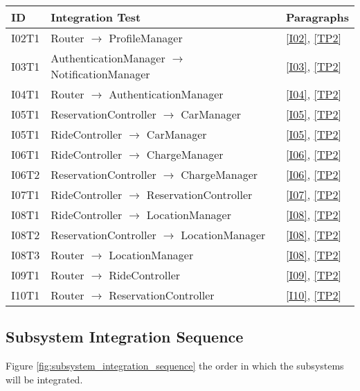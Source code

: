 	\begin{center}
		\vspace{0.6cm}
		\begin{tabular}{|l|l|l|}
			\hline
			\textbf{ID} & \textbf{Integration Test} & \textbf{Paragraphs} \bigstrut \\\hline
			\hline
			I02T1 & Router \ensuremath{\rightarrow} ProfileManager & \ref{I02}, \ref{TP2} \bigstrut \\\hline
			I03T1 & AuthenticationManager \ensuremath{\rightarrow} NotificationManager & \ref{I03}, \ref{TP2} \bigstrut \\\hline
			I04T1 & Router \ensuremath{\rightarrow} AuthenticationManager & \ref{I04}, \ref{TP2} \bigstrut \\\hline
			I05T1 & ReservationController \ensuremath{\rightarrow} CarManager & \ref{I05}, \ref{TP2} \bigstrut \\\hline
			I05T1 & RideController \ensuremath{\rightarrow} CarManager & \ref{I05}, \ref{TP2} \bigstrut \\\hline
			I06T1 & RideController \ensuremath{\rightarrow} ChargeManager & \ref{I06}, \ref{TP2} \bigstrut \\\hline
			I06T2 & ReservationController \ensuremath{\rightarrow} ChargeManager & \ref{I06}, \ref{TP2} \bigstrut \\\hline
			I07T1 & RideController \ensuremath{\rightarrow} ReservationController & \ref{I07}, \ref{TP2} \bigstrut \\\hline
			I08T1 & RideController \ensuremath{\rightarrow} LocationManager & \ref{I08}, \ref{TP2} \bigstrut \\\hline
			I08T2 & ReservationController \ensuremath{\rightarrow} LocationManager & \ref{I08}, \ref{TP2} \bigstrut \\\hline
			I08T3 & Router \ensuremath{\rightarrow} LocationManager & \ref{I08}, \ref{TP2} \bigstrut \\\hline
			I09T1 & Router \ensuremath{\rightarrow} RideController & \ref{I09}, \ref{TP2} \bigstrut \\\hline
			I10T1 & Router \ensuremath{\rightarrow} ReservationController & \ref{I10}, \ref{TP2} \bigstrut \\\hline
		\end{tabular}
	\end{center}

	\newpage
	\subsection{Subsystem Integration Sequence}
	Figure \ref{fig:subsystem_integration_sequence} the order in which the subsystems will be integrated.

